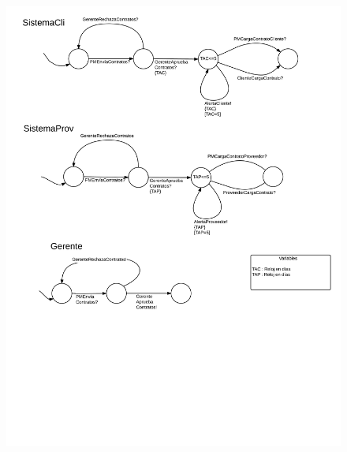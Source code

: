 \begin{figure}[H]
\includegraphics[width=\linewidth]{diag/nuevos/fsm-firmcont2.png}
\label{fsm-firmcont2}
\end{figure}
